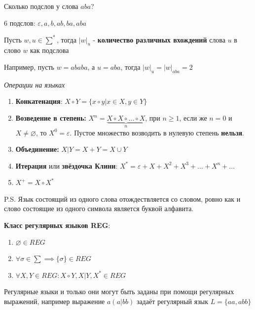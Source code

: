 \begin{question}
    Сколько подслов у слова $aba$?
\end{question}

\begin{nonum}
    6 подслов: $ \varepsilon , a, b, ab, ba, aba$
\end{nonum}

\begin{Def}
    Пусть $w, u \in \sum^{*}$, тогда $|w|_{u}$ - \textbf{количество различных вхождений} слова $u$ в слово $w$ как подслова
\end{Def}
Например, пусть $w = ababa$, а $u = aba$, тогда $|w|_u = |w|_{aba} = 2$

\begin{center}
    \textit{Операции на языках}
\end{center}

\begin{enumerate}
    \item \textbf{Конкатенация}: $X \circ Y = \{ x \circ y | x \in X, y \in Y\}$
    \item \textbf{Возведение в степень:} $X^n = \underbrace{X\circ X \circ \dots \circ X}_{n}$, при $n \geqslant 1$, если же $n = 0$ и $X \neq \varnothing$, то $X^0 = \varepsilon$. Пустое множество возводить в нулевую степень \textbf{нельзя}.
    \item \textbf{Объединение:} $X|Y = X + Y = X \cup Y$
    \item \textbf{Итерация} или \textbf{звёздочка Клини}: $X^{*} = \varepsilon + X + X^2 + X^3 + \dotsc + X^n + \dotsc$
    \item $X^+ = X \circ X^*$
\end{enumerate}
P.S. Язык состоящий из одного слова отождествляется со словом, ровно как и слово состоящие из одного символа является буквой алфавита.

\begin{Def}
    \textbf{Класс регулярных языков REG}:
\end{Def}
\begin{enumerate}
    \item $\varnothing \in REG$
    \item $\forall\sigma \in \sum \implies \{\sigma\} \in  REG$
    \item $\forall X, Y \in REG: X \circ Y, X|Y, X^* \in REG$
\end{enumerate}

Регулярные языки и только они могут быть заданы при помощи регулярных выражений, например выражение $a(a|bb)$ задаёт регулярный язык $L = \{aa, abb\}$


